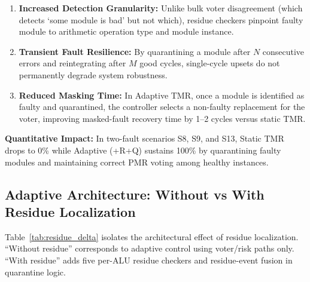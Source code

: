 \documentclass[conference]{IEEEtran}
\begin{document}
\begin{enumerate}
  \item \textbf{Increased Detection Granularity:} Unlike bulk voter disagreement (which detects `some module is bad' but not which), 
        residue checkers pinpoint faulty module to arithmetic operation type and module instance.
  
  \item \textbf{Transient Fault Resilience:} By quarantining a module after $N$ consecutive errors and reintegrating after $M$ good cycles, 
        single-cycle upsets do not permanently degrade system robustness.
  
  \item \textbf{Reduced Masking Time:} In Adaptive TMR, once a module is identified as faulty and quarantined, the controller 
        selects a non-faulty replacement for the voter, improving masked-fault recovery time by 1--2 cycles versus static TMR.
\end{enumerate}

\textbf{Quantitative Impact:} In two-fault scenarios S8, S9, and S13, Static TMR drops to 0\% while
Adaptive (+R+Q) sustains 100\% by quarantining faulty modules and maintaining correct PMR voting among healthy instances.

\subsection{Adaptive Architecture: Without vs With Residue Localization}

Table~\ref{tab:residue_delta} isolates the architectural effect of residue localization.
``Without residue'' corresponds to adaptive control using voter/risk paths only.
``With residue'' adds five per-ALU residue checkers and residue-event fusion in quarantine logic.
\end{document}
